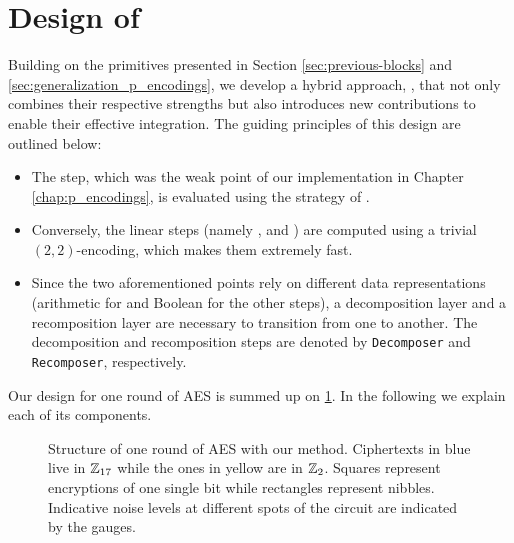 \section{Design of \hippo}
\label{sec:hippogryph_our_work}

Building on the primitives presented in Section \ref{sec:previous-blocks} and \ref{sec:generalization_p_encodings}, we develop a hybrid approach, \hippo, that not only combines their respective strengths but also introduces new contributions to enable their effective integration. The guiding principles of this design are outlined below:

\begin{itemize}
    \item The \SubBytes step, which was the weak point of our implementation in Chapter \ref{chap:p_encodings}, is evaluated using the strategy of \cite{DBLP:conf/wahc/TramaCBS23}.
    \item Conversely, the linear steps (namely \ShiftRows, \MixColumns and \AddRoundKey) are computed using a trivial $(2, 2)$-encoding, which makes them extremely fast.
    \item Since the two aforementioned points rely on different data representations (arithmetic for \SubBytes and Boolean for the other steps), a decomposition layer and a recomposition layer are necessary to transition from one to another. The decomposition and recomposition steps are denoted by \texttt{Decomposer} and \texttt{Recomposer}, respectively. %
\end{itemize}

Our design for one round of AES is summed up on \ref{fig:our_design}. In the following we explain each of its components.

%

\begin{figure}
	\centering
	
	\caption{Structure of one round of AES with our method. Ciphertexts in blue live in $\mathbb{Z}_{17}$ while the ones in yellow are in $\mathbb{Z}_2$. Squares represent encryptions of one single bit while rectangles represent nibbles. Indicative noise levels at different spots of the circuit are indicated by the gauges.} 
	\label{fig:our_design}
\end{figure}


